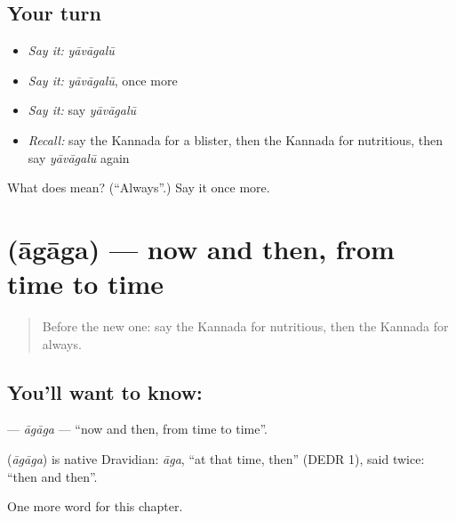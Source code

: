 \subsection*{Your turn}
\begin{itemize}
\raggedright
  \item \emph{Say it:} \emph{yāvāgalū}
  \item \emph{Say it:} \emph{yāvāgalū}, once more
  \item \emph{Say it:} say \emph{yāvāgalū}
  \item \emph{Recall:} say the Kannada for a blister, then the Kannada for nutritious, then say \emph{yāvāgalū} again
\end{itemize}

\begin{tcolorbox}[breakable,colback=teal!4,colframe=teal!35!black,title={Before you move on}]
What does  mean? (\textquotedblleft{}Always\textquotedblright{}.) Say it once more.
\end{tcolorbox}
\section[\texorpdfstring{\kn{ಆಗಾಗ} (āgāga)}{ಆಗಾಗ (āgāga)}]{ (āgāga) — now and then, from time to time}

\label{lesson:KA-C171-agaga}



\begin{quote}
Before the new one: say the Kannada for nutritious, then the Kannada for always.
\end{quote}

\subsection*{You'll want to know: }
\textbf{} — \emph{āgāga} — \textquotedblleft{}now and then, from time to time\textquotedblright{}.

\begin{cousinweb}
\textbf{} (\emph{āgāga}) is native Dravidian: \emph{āga}, \textquotedblleft{}at that time, then\textquotedblright{} (DEDR 1), said twice: \textquotedblleft{}then and then\textquotedblright{}.
\end{cousinweb}

\begin{grammarlens}[title={What you've built}]
One more word for this chapter.
\end{grammarlens}

